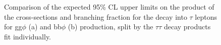\begin{figure}[!hbtp]
\centering
\caption[Plots of the expected model-independent limits split by the $\tau\tau$ decay channels.]{Comparison of the expected 95\% CL upper limits on the product of the cross-sections and branching fraction for the decay into $\tau$ leptons for gg$\phi$ (a) and bb$\phi$ (b) production, split by the $\tau\tau$ decay products fit individually.}
\label{fig:model_independent_limits_by_channel}
\end{figure}

